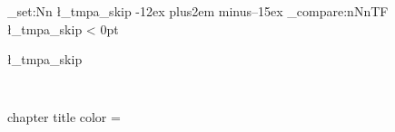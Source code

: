 \documentclass{article}
\begin{document}
\lipsum[1]
\ExplSyntaxOn
\makeatletter
%
%
\def\tempeverypar{}
 \skip_set:Nn \l_tmpa_skip {-12ex plus2em minus--15ex}
   \dim_compare:nNnTF {\l_tmpa_skip} < {0pt} {    } {}
% 
  \lipsum[1]\par
  
  \lipsum[1]\par
  
\the\l_tmpa_skip

\tt
\def\test{\color{blue}}\par

chapter title color =  \@roman\c@section
\end{document}
